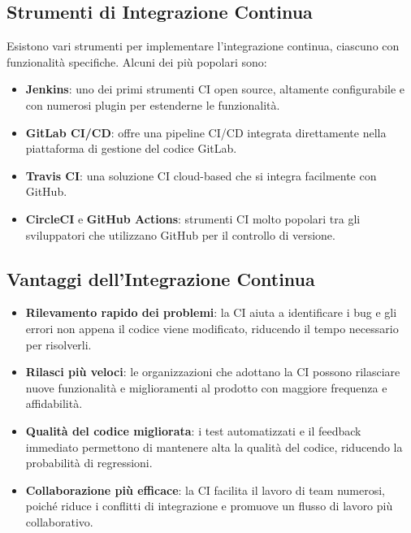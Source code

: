 \documentclass{article}
\begin{document}
\subsection*{Strumenti di Integrazione Continua}
Esistono vari strumenti per implementare l'integrazione continua, ciascuno con funzionalità specifiche. Alcuni dei più popolari sono:
\begin{itemize}
    \item \textbf{Jenkins}: uno dei primi strumenti CI open source, altamente configurabile e con numerosi plugin per estenderne le funzionalità.
    \item \textbf{GitLab CI/CD}: offre una pipeline CI/CD integrata direttamente nella piattaforma di gestione del codice GitLab.
    \item \textbf{Travis CI}: una soluzione CI cloud-based che si integra facilmente con GitHub.
    \item \textbf{CircleCI} e \textbf{GitHub Actions}: strumenti CI molto popolari tra gli sviluppatori che utilizzano GitHub per il controllo di versione.
\end{itemize}

\subsection*{Vantaggi dell'Integrazione Continua}
\begin{itemize}
    \item \textbf{Rilevamento rapido dei problemi}: la CI aiuta a identificare i bug e gli errori non appena il codice viene modificato, riducendo il tempo necessario per risolverli.
    \item \textbf{Rilasci più veloci}: le organizzazioni che adottano la CI possono rilasciare nuove funzionalità e miglioramenti al prodotto con maggiore frequenza e affidabilità.
    \item \textbf{Qualità del codice migliorata}: i test automatizzati e il feedback immediato permettono di mantenere alta la qualità del codice, riducendo la probabilità di regressioni.
    \item \textbf{Collaborazione più efficace}: la CI facilita il lavoro di team numerosi, poiché riduce i conflitti di integrazione e promuove un flusso di lavoro più collaborativo.
\end{itemize}
\end{document}
